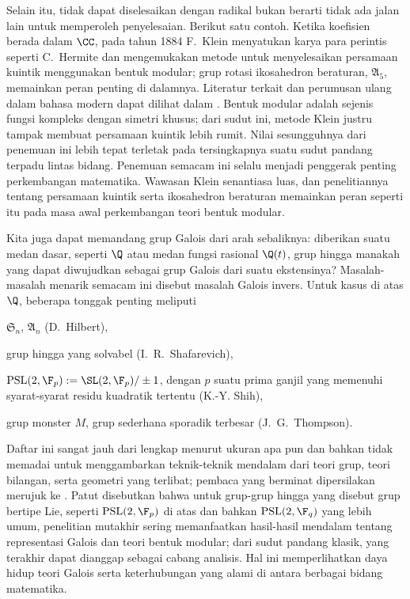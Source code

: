Selain itu, tidak dapat diselesaikan dengan radikal bukan berarti tidak ada jalan lain untuk memperoleh penyelesaian. Berikut satu contoh. Ketika koefisien berada dalam $\CC$, pada tahun 1884 F.\ Klein menyatukan karya para perintis seperti C.\ Hermite dan mengemukakan metode untuk menyelesaikan persamaan kuintik menggunakan bentuk modular; grup rotasi ikosahedron beraturan, $\mathfrak{A}_5$, memainkan peran penting di dalamnya. Literatur terkait dan perumusan ulang dalam bahasa modern dapat dilihat dalam \cite{Na14}. Bentuk modular adalah sejenis fungsi kompleks dengan simetri khusus; dari sudut ini, metode Klein justru tampak membuat persamaan kuintik lebih rumit. Nilai sesungguhnya dari penemuan ini lebih tepat terletak pada tersingkapnya suatu sudut pandang terpadu lintas bidang. Penemuan semacam ini selalu menjadi penggerak penting perkembangan matematika. Wawasan Klein senantiasa luas, dan penelitiannya tentang persamaan kuintik serta ikosahedron beraturan memainkan peran seperti itu pada masa awal perkembangan teori bentuk modular.

Kita juga dapat memandang grup Galois dari arah sebaliknya: diberikan suatu medan dasar, seperti $\Q$ atau medan fungsi rasional $\Q(t)$, grup hingga manakah yang dapat diwujudkan sebagai grup Galois dari suatu ekstensinya? Masalah-masalah menarik semacam ini disebut masalah Galois invers. Untuk kasus di atas $\Q$, beberapa tonggak penting meliputi 
\begin{compactitem}
	\item $\mathfrak{S}_n$, $\mathfrak{A}_n$ (D.\ Hilbert),
	\item grup hingga yang solvabel (I.\ R.\ Shafarevich),
	\item $\text{PSL}(2, \F_p) := \SL(2, \F_p)/\pm 1$, dengan $p$ suatu prima ganjil yang memenuhi syarat-syarat residu kuadratik tertentu (K.-Y. Shih),
	\item grup monster $M$, grup sederhana sporadik terbesar (J.\ G.\ Thompson).
\end{compactitem}
Daftar ini sangat jauh dari lengkap menurut ukuran apa pun dan bahkan tidak memadai untuk menggambarkan teknik-teknik mendalam dari teori grup, teori bilangan, serta geometri yang terlibat; pembaca yang berminat dipersilakan merujuk ke \cite{Ser08}. Patut disebutkan bahwa untuk grup-grup hingga yang disebut grup bertipe Lie, seperti $\text{PSL}(2, \F_p)$ di atas dan bahkan $\text{PSL}(2, \F_q)$ yang lebih umum, penelitian mutakhir sering memanfaatkan hasil-hasil mendalam tentang representasi Galois dan teori bentuk modular; dari sudut pandang klasik, yang terakhir dapat dianggap sebagai cabang analisis. Hal ini memperlihatkan daya hidup teori Galois serta keterhubungan yang alami di antara berbagai bidang matematika.

